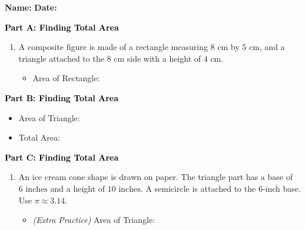 \documentclass[12pt, letterpaper, fleqn]{article}
\newcommand{\blanklong}{\underline{\hspace{6.5cm}}}
\begin{document}
\textbf{Name:} \underline{\hspace{5cm}}
\hfill
\textbf{Date:} \underline{\hspace{3cm}}\\

\begin{tcolorbox}[colback=customteal!20]
\large\textcolor{black}{\textbf{Part A: Finding Total Area}}
\end{tcolorbox}

\vspace{3mm}

\begin{enumerate}[itemsep=2.5cm, leftmargin=0.6cm]
\item A composite figure is made of a rectangle measuring $8\text{ cm}$ by $5\text{ cm}$, and a triangle attached to the $8\text{ cm}$ side with a height of $4\text{ cm}$.
\begin{itemize}
\item Area of Rectangle: \blanklong
\end{itemize}
\end{enumerate}

\newpage

\begin{tcolorbox}[colback=customteal!20]
\large\textcolor{black}{\textbf{Part B: Finding Total Area}}
\end{tcolorbox}

\vspace{3mm}

\begin{enumerate}[itemsep=2.5cm, leftmargin=0.6cm, resume]
\begin{itemize}
\item Area of Triangle: \blanklong
\item Total Area: \blanklong
\end{itemize}
\end{enumerate}

\newpage

\begin{tcolorbox}[colback=customteal!20]
\large\textcolor{black}{\textbf{Part C: Finding Total Area}}
\end{tcolorbox}

\vspace{3mm}

\begin{enumerate}[itemsep=2.5cm, leftmargin=0.6cm, resume]
\item An ice cream cone shape is drawn on paper. The triangle part has a base of $6\text{ inches}$ and a height of $10\text{ inches}$. A semicircle is attached to the $6$-inch base. Use $\pi \approx 3.14$.
\begin{itemize}
\item \textit{(Extra Practice)} Area of Triangle: \blanklong
\end{itemize}
\end{enumerate}
\end{document}
